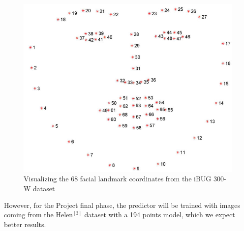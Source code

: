 \documentclass[12pt,a4paper]{article}
\begin{document}
    \begin{figure}[!hb]
        \centering
        \includegraphics[scale=0.25]{facia_landmarks.jpg}
        \caption{Visualizing the 68 facial landmark coordinates from the iBUG 300-W dataset}
        \label{Landmark}
    \end{figure}
    
    However, for the Project final phase, the predictor will be trained with images coming from the Helen$^{[3]}$ dataset with a 194 points model, which we expect better results.
    
\end{document}
